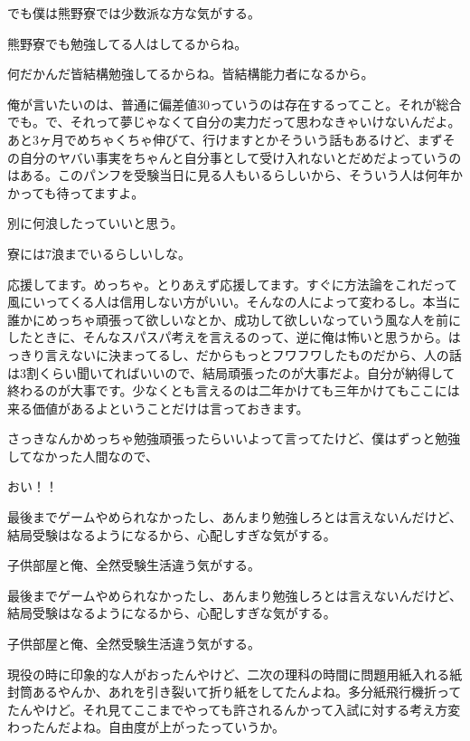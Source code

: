\begin{multicols}{2}
でも僕は熊野寮では少数派な方な気がする。

熊野寮でも勉強してる人はしてるからね。

何だかんだ皆結構勉強してるからね。皆結構能力者になるから。

俺が言いたいのは、普通に偏差値30っていうのは存在するってこと。それが総合でも。で、それって夢じゃなくて自分の実力だって思わなきゃいけないんだよ。あと3ヶ月でめちゃくちゃ伸びて、行けますとかそういう話もあるけど、まずその自分のヤバい事実をちゃんと自分事として受け入れないとだめだよっていうのはある。このパンフを受験当日に見る人もいるらしいから、そういう人は何年かかっても待ってますよ。

別に何浪したっていいと思う。

寮には7浪までいるらしいしな。

応援してます。めっちゃ。とりあえず応援してます。すぐに方法論をこれだって風にいってくる人は信用しない方がいい。そんなの人によって変わるし。本当に誰かにめっちゃ頑張って欲しいなとか、成功して欲しいなっていう風な人を前にしたときに、そんなスパスパ考えを言えるのって、逆に俺は怖いと思うから。はっきり言えないに決まってるし、だからもっとフワフワしたものだから、人の話は3割くらい聞いてればいいので、結局頑張ったのが大事だよ。自分が納得して終わるのが大事です。少なくとも言えるのは二年かけても三年かけてもここには来る価値があるよということだけは言っておきます。

さっきなんかめっちゃ勉強頑張ったらいいよって言ってたけど、僕はずっと勉強してなかった人間なので、

おい！！ 

最後までゲームやめられなかったし、あんまり勉強しろとは言えないんだけど、結局受験はなるようになるから、心配しすぎな気がする。

子供部屋と俺、全然受験生活違う気がする。

最後までゲームやめられなかったし、あんまり勉強しろとは言えないんだけど、結局受験はなるようになるから、心配しすぎな気がする。

子供部屋と俺、全然受験生活違う気がする。

現役の時に印象的な人がおったんやけど、二次の理科の時間に問題用紙入れる紙封筒あるやんか、あれを引き裂いて折り紙をしてたんよね。多分紙飛行機折ってたんやけど。それ見てここまでやっても許されるんかって入試に対する考え方変わったんだよね。自由度が上がったっていうか。


\end{multicols}
